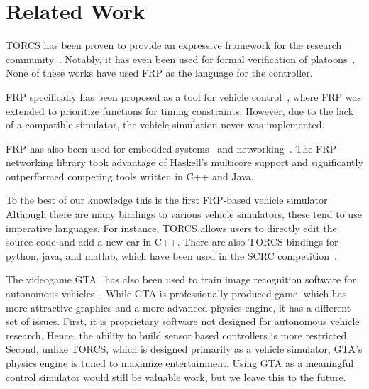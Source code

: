 \section{Related Work}

TORCS has been proven to provide an expressive framework for the research community~\cite{OnievaPAMP09,conf/cig/CardamoneLL09,conf/cig/MunozGS10}. 
Notably, it has even been used for formal verification of platoons~\cite{kamali2016formal,xu2016experimental}. 
None of these works have used FRP as the language for the controller.


FRP specifically has been proposed as a tool for vehicle control~\cite{kazemi2016,zou2016}, where FRP was extended to prioritize functions for timing constraints. However, due to the lack of a compatible simulator, the vehicle simulation never was implemented. 

FRP has also been used for embedded systems~\cite{helbling2016juniper} and networking~\cite{voellmy2012scalable}.
The FRP networking library took advantage of Haskell's multicore support and significantly outperformed competing tools written in C++ and Java.


To the best of our knowledge this is the first FRP-based vehicle simulator.
Although there are many bindings to various vehicle simulators, these tend to use imperative languages.
For instance, TORCS allows users to directly edit the source code and add a new car in C++.
There are also TORCS bindings for python, java, and matlab, which have been used in the SCRC competition~\cite{SCRC}.

The videogame GTA~\cite{gtaV} has also been used to train image recognition software for autonomous vehicles~\cite{gtaPrinceton}.
While GTA is professionally produced game, which has more attractive graphics and a more advanced physics engine, it has a different set of issues.
First, it is proprietary software not designed for autonomous vehicle research. 
Hence, the ability to build sensor based controllers is more restricted. 
Second, unlike TORCS, which is designed primarily as a vehicle simulator, GTA's physics engine is tuned to maximize entertainment.
Using GTA as a meaningful control simulator would still be valuable work, but we leave this to the future.
